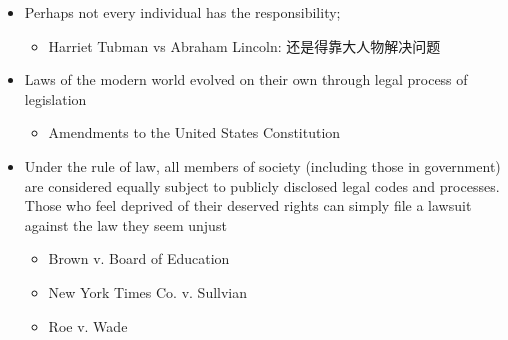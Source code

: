\documentclass{article}
\begin{document}
\begin{itemize}
\begin{itemize}
      \item Perhaps not every individual has the responsibility;
      \begin{itemize}
        \item Harriet Tubman vs Abraham Lincoln: 还是得靠大人物解决问题
      \end{itemize}

      \item Laws of the modern world evolved on their own through
      legal process of legislation
      \begin{itemize}
        \item Amendments to the United States Constitution
      \end{itemize}

      \item Under the rule of law, all members of society
      (including those in government) are considered equally subject to
      publicly disclosed legal codes and processes. Those who feel deprived
      of their deserved rights can simply file a lawsuit against the law
      they seem unjust
      \begin{itemize}
        \item Brown v. Board of Education
        \item New York Times Co. v. Sullvian
        \item Roe v. Wade
      \end{itemize}
    \end{itemize}
  \end{itemize}
\end{document}
